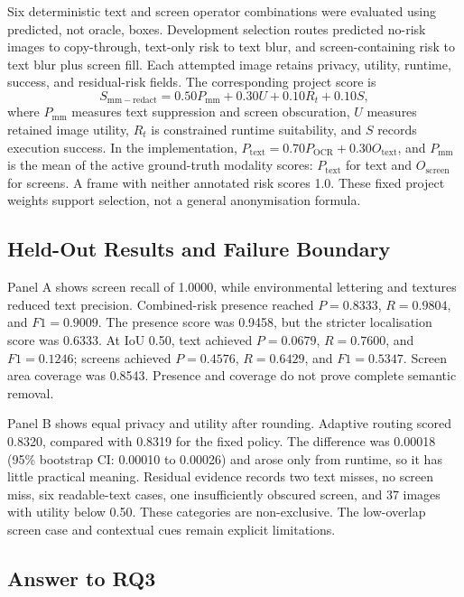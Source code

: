\documentclass[10pt,twocolumn]{IEEEtran}
\begin{document}
Six deterministic text and screen operator combinations were evaluated using
predicted, not oracle, boxes. Development selection routes predicted no-risk
images to copy-through, text-only risk to text blur, and screen-containing risk
to text blur plus screen fill. Each attempted image retains privacy, utility,
runtime, success, and residual-risk fields. The corresponding project score is
\begin{equation}
S_{\mathrm{mm-redact}}=0.50P_{\mathrm{mm}}+0.30U+0.10R_t+0.10S ,
\label{eq:mm-redact}
\end{equation}
where $P_{\mathrm{mm}}$ measures text suppression and screen obscuration, $U$
measures retained image utility, $R_t$ is constrained runtime suitability, and
$S$ records execution success. In the implementation,
$P_{\mathrm{text}}=0.70P_{\mathrm{OCR}}+0.30O_{\mathrm{text}}$, and
$P_{\mathrm{mm}}$ is the mean of the active ground-truth modality scores:
$P_{\mathrm{text}}$ for text and $O_{\mathrm{screen}}$ for screens. A frame
with neither annotated risk scores 1.0. These fixed project weights support
selection, not a general anonymisation formula.

\subsection{Held-Out Results and Failure Boundary}

Panel A shows screen recall of 1.0000, while environmental lettering and
textures reduced text precision. Combined-risk presence reached $P=0.8333$,
$R=0.9804$, and $F1=0.9009$. The presence score was 0.9458, but the stricter
localisation score was 0.6333. At IoU 0.50, text achieved $P=0.0679$,
$R=0.7600$, and $F1=0.1246$; screens achieved $P=0.4576$, $R=0.6429$, and
$F1=0.5347$. Screen area coverage was 0.8543. Presence and coverage do not prove
complete semantic removal.

Panel B shows equal privacy and utility after rounding. Adaptive routing scored
0.8320, compared with 0.8319 for the fixed policy. The difference was 0.00018
(95\% bootstrap CI: 0.00010 to 0.00026) and arose only from runtime, so it has
little practical meaning. Residual evidence records two text misses, no screen
miss, six readable-text cases, one insufficiently obscured screen, and 37
images with utility below 0.50. These categories are non-exclusive. The
low-overlap screen case and contextual cues remain explicit limitations.

\subsection{Answer to RQ3}
\end{document}
